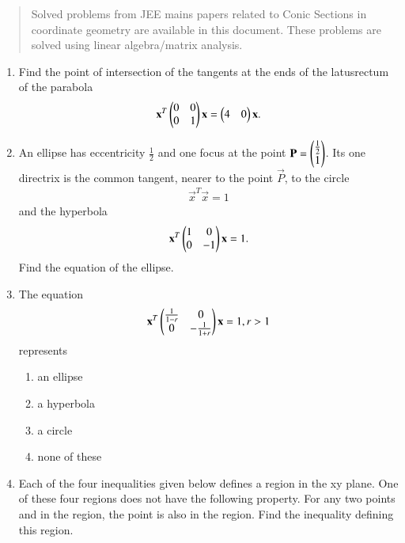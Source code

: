 \documentclass[journal,12pt,twocolumn]{IEEEtran}
\begin{document}
\begin{abstract}
	Solved problems from JEE mains papers related to Conic Sections in coordinate geometry are 
available in this document.  These problems are solved using linear algebra/matrix analysis.
\end{abstract}
\begin{enumerate}[label=\arabic*]

\item Find the point of intersection of the tangents at the ends of the latusrectum of the parabola
\begin{align} 
\mathbf {x}^T \begin{pmatrix}0 & 0 \\ 0 & 1\end{pmatrix} \mathbf {x}=\begin{pmatrix}4&0\end{pmatrix}\mathbf {x}.
\end{align} 
\item An ellipse has eccentricity $\frac{1}{2}$ and one focus at the point $\mathbf{P}=\begin{pmatrix}\frac{1}{2}\\1\end{pmatrix}$. Its one directrix is the common tangent, nearer to the point $\vec{P}$, to the circle 
    \begin{align}
    \vec {x}^T \vec {x} =1
    \end{align} and the hyperbola 
    \begin{align}
    \mathbf {x}^T \begin{pmatrix}1& 0 \\0 &-1\end{pmatrix}\mathbf {x}=1.
    \end{align} Find the equation of the ellipse.
\item The equation 
    \begin{align}
    \mathbf {x}^T \begin{pmatrix}\frac{1}{1-r} & 0 \\ 0 &-\frac {1}{1+r}\end{pmatrix}\mathbf{x} = 1, r>1
    \end{align} represents
    \begin{enumerate}
    \item an ellipse
    \item a hyperbola
    \item a circle
    \item none of these
    \end{enumerate} 
    \item Each of the four inequalities given below defines a region in the xy plane. One of these four regions does not have the following property. For any two points  and  in the region, the point  is also in the region. Find the inequality defining this region.

\end{enumerate}
\end{document}
